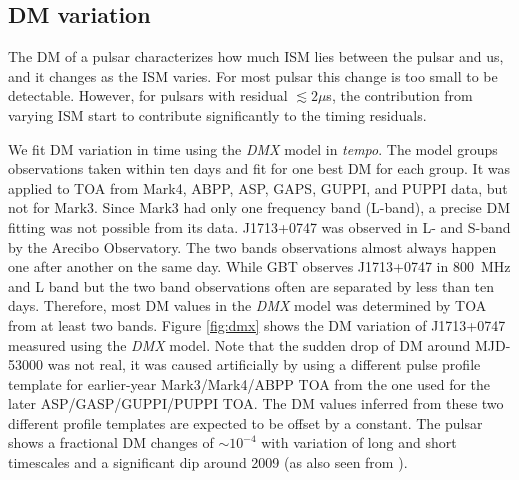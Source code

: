 \subsection{DM variation}
\label{sec:dmx}
The DM of a pulsar characterizes how much ISM lies
between the pulsar and us, and it changes as the ISM varies. For most pulsar
this change is too small to be detectable. However, for pulsars with residual
$\lesssim2\mu$s, the contribution from varying ISM start to contribute
significantly to the timing residuals. 

We fit DM variation in time using the {\it DMX} model in {\it tempo}.
The model groups observations taken within ten days and fit for one
best DM for each group.   
It was applied to TOA from Mark4, ABPP, ASP, GAPS, GUPPI, and PUPPI data, but
not for Mark3. Since Mark3 had only one frequency band (L-band), a precise DM
fitting was not possible from its data.
J1713+0747 was observed in L- and S-band by the Arecibo Observatory. The
two bands observations almost always happen one after another on the same day.
While GBT observes J1713+0747 in 800~MHz and L band but the two band
observations often are separated by less than ten days.
Therefore, most DM values in the {\it DMX} model was determined by TOA from at
least two bands. Figure \ref{fig:dmx} shows the DM variation of J1713+0747 
measured using the {\it DMX} model.
Note that the sudden drop of DM around MJD-53000 was not real, it was caused
artificially by using a different pulse profile template for earlier-year Mark3/Mark4/ABPP TOA 
from the one used for the later
ASP/GASP/GUPPI/PUPPI TOA. The DM values inferred from these two different profile
templates are expected to be offset by a constant.
The pulsar shows a fractional DM changes of $\sim10^{-4}$ with variation of
long and short timescales and a significant dip around 2009 (as also seen from
\citealt{dfg+13}).



